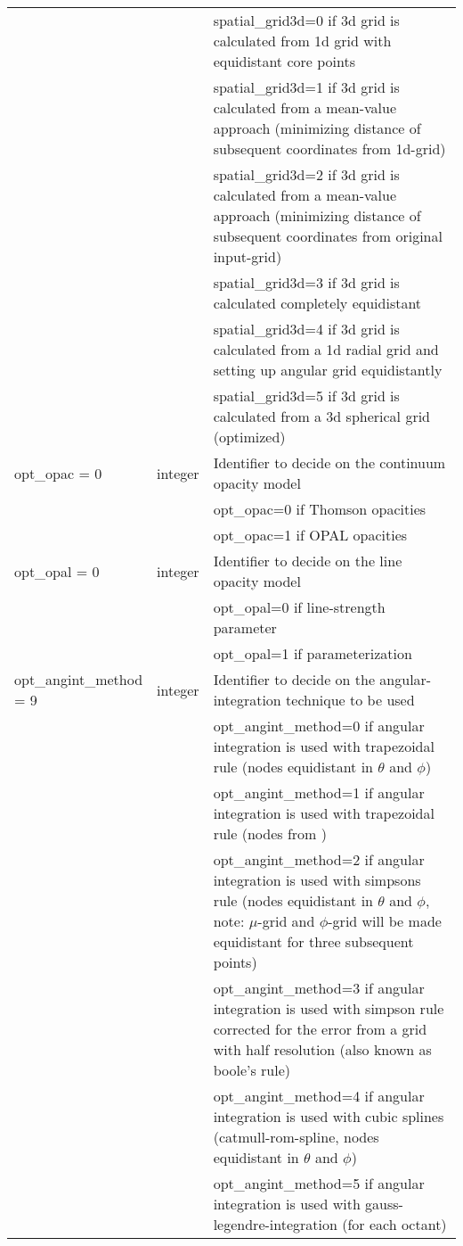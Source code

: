 \documentclass[10pt,a4paper]{article}
\begin{document}
\begin{footnotesize}
\begin{longtable}[h]{p{0.24\linewidth}p{0.07\linewidth}p{0.69\linewidth}}
& & spatial\_grid3d=0 if 3d grid is calculated from 1d grid with equidistant core points  \\
& & spatial\_grid3d=1 if 3d grid is calculated from a mean-value approach (minimizing distance of subsequent coordinates from 1d-grid) \\
& & spatial\_grid3d=2 if 3d grid is calculated from a mean-value approach  (minimizing distance of subsequent coordinates from original input-grid) \\
& & spatial\_grid3d=3 if 3d grid is calculated completely equidistant \\
& & spatial\_grid3d=4 if 3d grid is calculated from a 1d radial grid and setting up angular grid equidistantly \\
& & spatial\_grid3d=5 if 3d grid is calculated from a 3d spherical grid (optimized) \\
%
opt\_opac = 0 & integer & Identifier to decide on the continuum opacity model \\
 & & opt\_opac=0 if Thomson opacities \\
 & & opt\_opac=1 if OPAL opacities \\
%
opt\_opal = 0 & integer & Identifier to decide on the line opacity model \\
 & & opt\_opal=0 if line-strength parameter \\
 & & opt\_opal=1 if \cite{Hamann80} parameterization \\
%
opt\_angint\_method = 9 & integer & Identifier to decide on the angular-integration technique to be used \\
 & & opt\_angint\_method=0 if angular integration is used with trapezoidal rule (nodes equidistant in $\theta$ and $\phi$) \\
 & & opt\_angint\_method=1 if angular integration is used with trapezoidal rule (nodes from \cite{Lobel08}) \\
 & &  opt\_angint\_method=2 if angular integration is used with simpsons rule (nodes equidistant in $\theta$ and $\phi$, note: $\mu$-grid and $\phi$-grid will be made equidistant for three subsequent points) \\
 & & opt\_angint\_method=3 if angular integration is used with simpson rule corrected for the error from a grid with half resolution (also known as boole's rule) \\
 & & opt\_angint\_method=4 if angular integration is used with cubic splines (catmull-rom-spline, nodes equidistant in $\theta$ and $\phi$) \\
 & & opt\_angint\_method=5 if angular integration is used with gauss-legendre-integration (for each octant) \\

\end{longtable}
\end{footnotesize}
\end{document}
